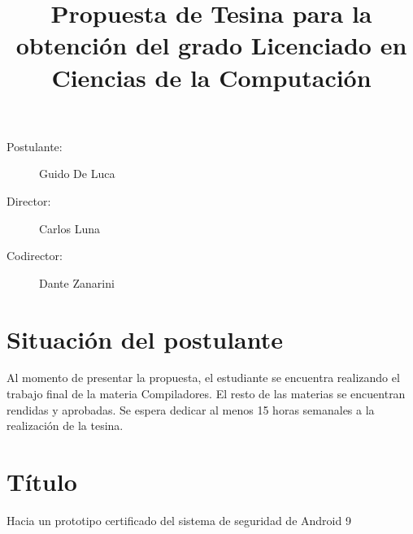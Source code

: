 \documentclass[a4paper]{article}
\begin{document}
\title{Propuesta de Tesina para la obtención del grado Licenciado en Ciencias de la Computación}
\maketitle

\begin{description}
    \item[Postulante: ] Guido De Luca
    \item[Director: ] Carlos Luna
    \item[Codirector: ] Dante Zanarini
\end{description}

\section{Situación del postulante}
Al momento de presentar la propuesta, el estudiante se encuentra realizando el
trabajo final de la materia Compiladores. El resto de las materias se encuentran
rendidas y aprobadas. Se espera dedicar al menos 15 horas semanales a la realización
de la tesina.

\section{Título}
Hacia un prototipo certificado del sistema de seguridad de Android 9









\printbibliography
\end{document}
